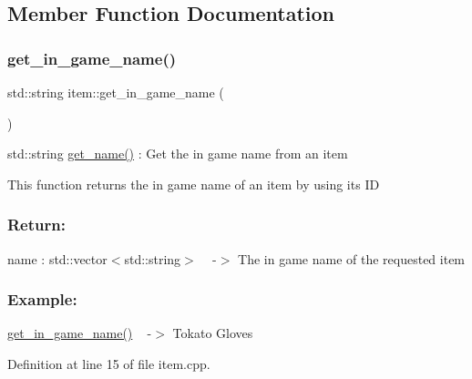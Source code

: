 \subsection{Member Function Documentation}
\mbox{\label{classitem_aa5a9140482a7d88d6a3eea342cb0c082}} 
\subsubsection{\texorpdfstring{get\+\_\+in\+\_\+game\+\_\+name()}{get\_in\_game\_name()}}
{\footnotesize\ttfamily std\+::string item\+::get\+\_\+in\+\_\+game\+\_\+name (\begin{DoxyParamCaption}{ }\end{DoxyParamCaption})}



std\+::string \hyperlink{classitem_ab7c2fa653e0f9a565283b60ca325f2a7}{get\+\_\+name()} \+: Get the in game name from an item 

This function returns the in game name of an item by using its ID

\subsubsection*{Return\+: }

name \+: std\+::vector$<$std\+::string$>$ ~\newline
-\/$>$ The in game name of the requested item

\subsubsection*{Example\+: }

\hyperlink{classitem_aa5a9140482a7d88d6a3eea342cb0c082}{get\+\_\+in\+\_\+game\+\_\+name()} ~\newline
-\/$>$ Tokato Gloves 

Definition at line 15 of file item.\+cpp.

